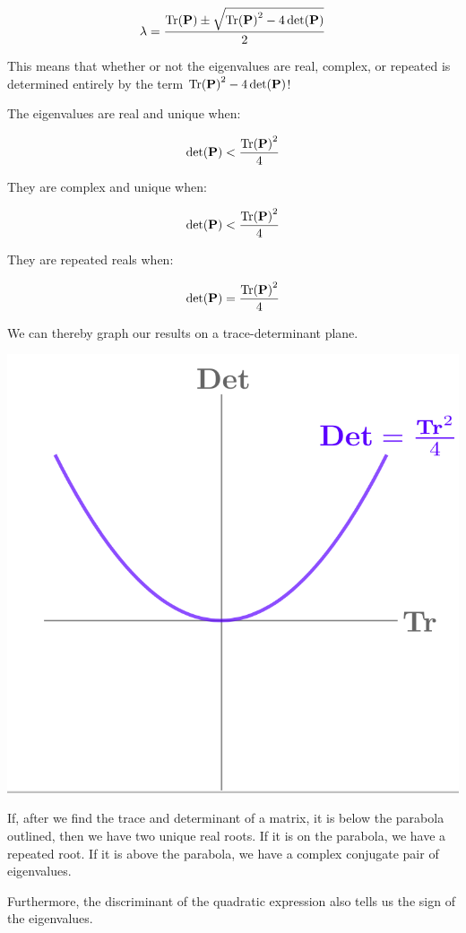 \documentclass{report}
\begin{document}
$$\lambda = \frac{\Tr(\mathbf{P}) \pm \sqrt{\Tr(\mathbf{P})^2-4\det(\mathbf{P}) }}{2}$$

This means that whether or not the eigenvalues are real, complex, or repeated is determined entirely by the term $\Tr(\mathbf{P})^2-4\det(\mathbf{P})$!

The eigenvalues are real and unique when:

$$\det(\mathbf{P}) < \frac{\Tr(\mathbf{P})^2}{4}$$

They are complex and unique when:

$$\det(\mathbf{P}) < \frac{\Tr(\mathbf{P})^2}{4}$$

They are repeated reals when:

$$\det(\mathbf{P}) = \frac{\Tr(\mathbf{P})^2}{4}$$

We can thereby graph our results on a trace-determinant plane.

\includegraphics[scale=0.3]{tr-det.png}

If, after we find the trace and determinant of a matrix, it is below the parabola outlined, then we have two unique real roots. If it is on the parabola, we have a repeated root. If it is above the parabola, we have a complex conjugate pair of eigenvalues.


Furthermore, the discriminant of the quadratic expression also tells us the sign of the eigenvalues.
\end{document}

